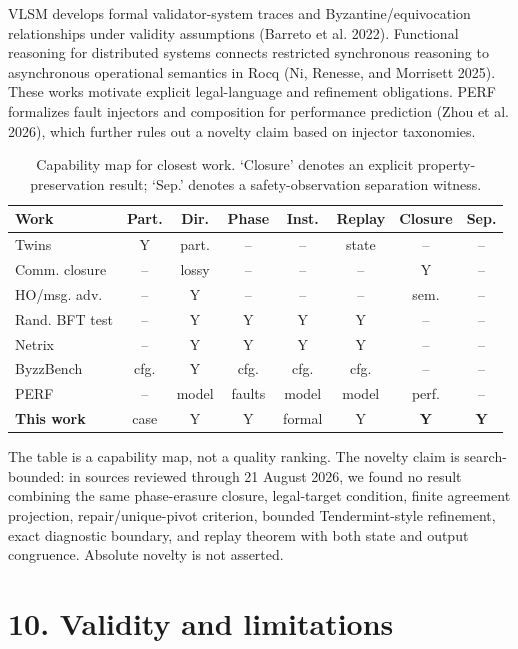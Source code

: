 \documentclass[10pt,a4paper]{article}
\begin{document}
VLSM develops formal validator-system traces and Byzantine/equivocation
relationships under validity assumptions (Barreto et al. 2022).
Functional reasoning for distributed systems connects restricted
synchronous reasoning to asynchronous operational semantics in Rocq (Ni,
Renesse, and Morrisett 2025). These works motivate explicit
legal-language and refinement obligations. PERF formalizes fault
injectors and composition for performance prediction (Zhou et al. 2026),
which further rules out a novelty claim based on injector taxonomies.

\begin{table}[t]
\centering
\scriptsize
\setlength{\tabcolsep}{2.5pt}
\begin{tabular}{lccccccc}
\toprule
Work & Part. & Dir. & Phase & Inst. & Replay & Closure & Sep.\\
\midrule
Twins & Y & part. & -- & -- & state & -- & --\\
Comm. closure & -- & lossy & -- & -- & -- & Y & --\\
HO/msg. adv. & -- & Y & -- & -- & -- & sem. & --\\
Rand. BFT test & -- & Y & Y & Y & Y & -- & --\\
Netrix & -- & Y & Y & Y & Y & -- & --\\
ByzzBench & cfg. & Y & cfg. & cfg. & cfg. & -- & --\\
PERF & -- & model & faults & model & model & perf. & --\\
\textbf{This work} & case & Y & Y & formal & Y & \textbf{Y} & \textbf{Y}\\
\bottomrule
\end{tabular}
\caption{Capability map for closest work. `Closure' denotes an explicit property-preservation result; `Sep.' denotes a safety-observation separation witness.}
\end{table}

The table is a capability map, not a quality ranking. The novelty claim
is search-bounded: in sources reviewed through 21 August 2026, we found
no result combining the same phase-erasure closure, legal-target
condition, finite agreement projection, repair/unique-pivot criterion,
bounded Tendermint-style refinement, exact diagnostic boundary, and
replay theorem with both state and output congruence. Absolute novelty
is not asserted.

\section{10. Validity and limitations}\label{validity-and-limitations}
\end{document}
